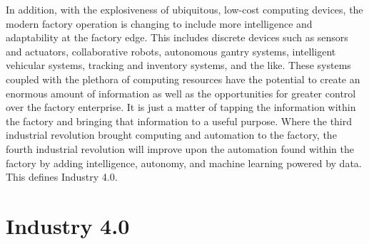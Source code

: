 In addition, with the explosiveness of ubiquitous, low-cost computing devices, the modern factory operation is changing to include more intelligence and adaptability at the factory edge.  This includes discrete devices such as sensors and actuators, collaborative robots, autonomous gantry systems, intelligent vehicular systems, tracking and inventory systems, and the like.  These systems coupled with the plethora of computing resources have the potential to create an enormous amount of information as well as the opportunities for greater control over the factory enterprise.  It is just a matter of tapping the information within the factory and bringing that information to a useful purpose.  Where the third industrial revolution brought computing and automation to the factory, the fourth industrial revolution will improve upon the automation found within the factory by adding intelligence, autonomy, and machine learning powered by data. This defines Industry 4.0.  

\section{Industry 4.0}

